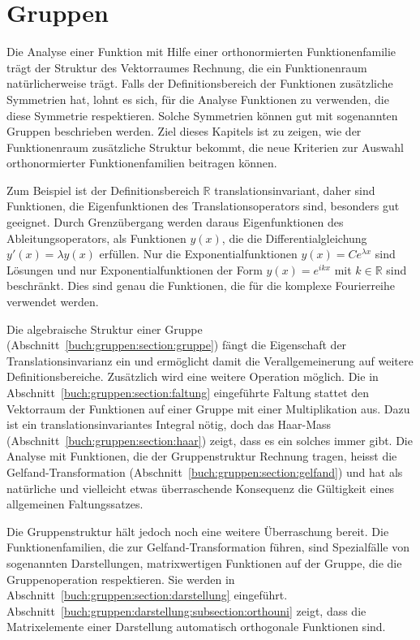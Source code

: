 %
%
%
\chapter{Gruppen
\label{buch:chapter:gruppen}}
Die Analyse einer Funktion mit Hilfe einer orthonormierten
Funktionenfamilie trägt der Struktur des Vektorraumes Rechnung,
die ein Funktionenraum natürlicherweise trägt.
Falls der Definitionsbereich der Funktionen zusätzliche Symmetrien
hat, lohnt es sich, für die Analyse Funktionen zu verwenden, die
diese Symmetrie respektieren.
Solche Symmetrien können gut mit sogenannten Gruppen beschrieben
werden.
Ziel dieses Kapitels ist zu zeigen, wie der Funktionenraum
zusätzliche Struktur bekommt, die neue Kriterien zur Auswahl orthonormierter
Funktionenfamilien beitragen können.

Zum Beispiel ist der Definitionsbereich $\mathbb{R}$ translationsinvariant,
daher sind Funktionen, die Eigenfunktionen des Translationsoperators
sind, besonders gut geeignet. 
Durch Grenzübergang werden daraus Eigenfunktionen des Ableitungsoperators,
als Funktionen $y(x)$, die die Differentialgleichung $y'(x)=\lambda y(x)$
erfüllen.
Nur die Exponentialfunktionen $y(x)=Ce^{\lambda x}$ sind Lösungen und nur
Exponentialfunktionen der Form $y(x)=e^{ikx}$ mit $k\in\mathbb{R}$
sind beschränkt.
Dies sind genau die Funktionen, die für die komplexe Fourierreihe
verwendet werden.

Die algebraische Struktur einer Gruppe
(Abschnitt~\ref{buch:gruppen:section:gruppe})
fängt die Eigenschaft der Translationsinvarianz ein und ermöglicht
damit die Verallgemeinerung auf weitere Definitionsbereiche.
Zusätzlich wird eine weitere Operation möglich.
Die in Abschnitt~\ref{buch:gruppen:section:faltung} eingeführte
Faltung stattet den Vektorraum der Funktionen auf einer Gruppe
mit einer Multiplikation aus.
Dazu ist ein translationsinvariantes Integral nötig, doch das
Haar-Mass (Abschnitt~\ref{buch:gruppen:section:haar}) zeigt,
dass es ein solches immer gibt.
Die Analyse mit Funktionen, die der Gruppenstruktur Rechnung tragen,
heisst die Gelfand-Transformation
(Abschnitt~\ref{buch:gruppen:section:gelfand})
und hat als natürliche und vielleicht
etwas überraschende Konsequenz die Gültigkeit eines allgemeinen
Faltungssatzes.

Die Gruppenstruktur hält jedoch noch eine weitere Überraschung bereit.
Die Funktionenfamilien, die zur Gelfand-Transformation führen,
sind Spezialfälle von sogenannten Darstellungen, matrixwertigen
Funktionen auf der Gruppe, die die Gruppenoperation respektieren.
Sie werden in Abschnitt~\ref{buch:gruppen:section:darstellung}
eingeführt.
Abschnitt~\ref{buch:gruppen:darstellung:subsection:orthouni}
zeigt, dass die Matrixelemente einer Darstellung automatisch
orthogonale Funktionen sind.

